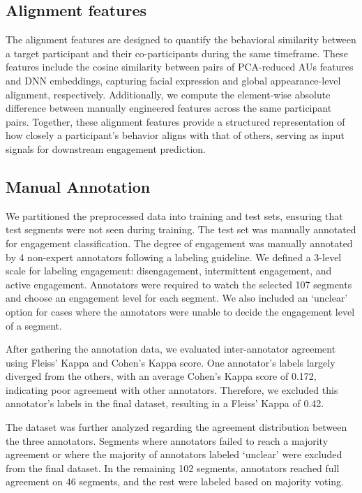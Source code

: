 \documentclass[
]{ceurart}
\begin{document}
\subsection{Alignment features}
The alignment features are designed to quantify the behavioral similarity between a target participant and their co-participants during the same timeframe. These features include the cosine similarity between pairs of PCA-reduced AUs features and DNN embeddings, capturing facial expression and global appearance-level alignment, respectively. Additionally, we compute the element-wise absolute difference between manually engineered features across the same participant pairs. Together, these alignment features provide a structured representation of how closely a participant's behavior aligns with that of others, serving as input signals for downstream engagement prediction.

\subsection{Manual Annotation}
We partitioned the preprocessed data into training and test sets, ensuring that test segments were not seen during training. The test set was manually annotated for engagement classification. The degree of engagement was manually annotated by 4 non-expert annotators following a labeling guideline. We defined a 3-level scale for labeling engagement: disengagement, intermittent engagement, and active engagement. Annotators were required to watch the selected 107 segments and choose an engagement level for each segment. We also included an ‘unclear’ option for cases where the annotators were unable to decide the engagement level of a segment. 

After gathering the annotation data, we evaluated inter-annotator agreement using Fleiss' Kappa\cite{fleiss1971measuring} and Cohen’s Kappa\cite{cohen1960coefficient} score. One annotator’s labels largely diverged from the others, with an average Cohen’s Kappa score of 0.172, indicating poor agreement with other annotators. Therefore, we excluded this annotator’s labels in the final dataset, resulting in a Fleiss' Kappa of 0.42.

The dataset was further analyzed regarding the agreement distribution between the three annotators. Segments where annotators failed to reach a majority agreement or where the majority of annotators labeled ‘unclear’ were excluded from the final dataset. In the remaining 102 segments, annotators reached full agreement on 46 segments, and the rest were labeled based on majority voting.
\end{document}
